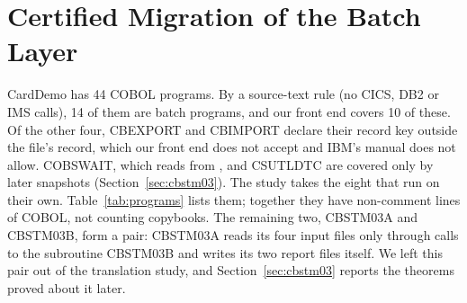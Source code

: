 \section{Certified Migration of the Batch Layer}
\label{sec:migration}

CardDemo has 44 COBOL programs. By a source-text rule (no CICS, DB2 or IMS calls), 14 of them are batch programs,
and our front end covers 10 of these. Of the other four, CBEXPORT and CBIMPORT declare
their record key outside the file's record, which our front end does not accept and IBM's manual does not allow. COBSWAIT, which reads from
, and CSUTLDTC are covered only by later snapshots (Section~\ref{sec:cbstm03}). The study takes the eight that run on their own.
Table~\ref{tab:programs} lists them; together they have \aCobolLines{} non-comment lines of COBOL, not counting
copybooks. The remaining two, CBSTM03A and CBSTM03B, form a pair: CBSTM03A reads its four input files only through calls to the subroutine
CBSTM03B and writes its two report files itself. We left this pair out of the translation study, and
Section~\ref{sec:cbstm03} reports the theorems proved about it later.

